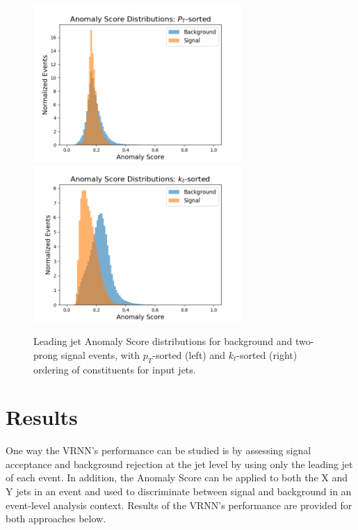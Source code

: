 \documentclass[12pt, a4paper]{article}
\begin{document}
\begin{figure}[H]
	\begin{center}
		\includegraphics[width=225pt]{imgs/Anom_Score_CompPt_SaveForPaper.png}
		\includegraphics[width=225pt]{imgs/Anom_Score_CompKt_SaveForPaper.png}
	\end{center}
	\caption{Leading jet Anomaly Score distributions for background and two-prong signal events, with $p_T$-sorted (left) and $k_{t}$-sorted (right) ordering of constituents for input jets.}
	\label{fig:score_comp}
\end{figure}





\section{Results}

One way the VRNN's performance can be studied is by assessing signal acceptance and background rejection at the jet level by using only the leading jet of each event. In addition, the Anomaly Score can be applied to both the X and Y jets in an event and used to discriminate between signal and background in an event-level analysis context. Results of the VRNN's performance are provided for both approaches below.
\end{document}
